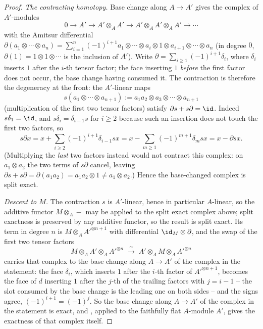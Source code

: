 \begin{proof}
\emph{The contracting homotopy.}  Base change along $A\to A'$ gives the
complex of $A'$-modules
\[
0\to A'\to A'\otimes_AA'\to A'\otimes_AA'\otimes_AA'\to\cdots
\]
with the Amitsur differential
$\partial(a_1\otimes\cdots\otimes a_n)=
\sum_{i=1}^n(-1)^{i+1}a_1\otimes\cdots\otimes a_i\otimes1\otimes
a_{i+1}\otimes\cdots\otimes a_n$ (in degree $0$,
$\partial(1)=1\otimes1\otimes\cdots$ is the inclusion of $A'$).
Write $\partial=\sum_{i\ge1}(-1)^{i+1}\delta_i$, where $\delta_i$ inserts
$1$ after the $i$-th tensor factor; the face inserting $1$ \emph{before}
the first factor does not occur, the base change having consumed it.
The contraction is therefore the degeneracy at the front: the
$A'$-linear maps
\[
s(a_1\otimes\cdots\otimes a_{n+1}):=a_1a_2\otimes a_3\otimes\cdots
\otimes a_{n+1}
\]
(multiplication of the first two tensor factors) satisfy
$\partial s+s\partial=\id$.  Indeed $s\delta_1=\id$, and
$s\delta_i=\delta_{i-1}s$ for $i\ge2$ because such an insertion does not
touch the first two factors, so
\[
s\partial x=x+\sum_{i\ge2}(-1)^{i+1}\delta_{i-1}sx
=x-\sum_{m\ge1}(-1)^{m+1}\delta_msx=x-\partial sx .
\]
(Multiplying the \emph{last} two factors instead would not contract this
complex: on $a_1\otimes a_2$ the two terms of $s\partial$ cancel, leaving
$\partial s+s\partial=\partial(a_1a_2)=a_1a_2\otimes1\ne a_1\otimes a_2$.)
Hence the base-changed complex is split exact.

\emph{Descent to $M$.}  The contraction $s$ is $A'$-linear, hence in
particular $A$-linear, so the additive functor $M\otimes_A-$ may be
applied to the split exact complex above; split exactness is preserved
by any additive functor, so the result is split exact.  Its term in
degree $n$ is $M\otimes_AA'^{\otimes n+1}$ with differential
$\id_M\otimes\partial$, and the swap of the first two tensor factors
\[
M\otimes_AA'\otimes_AA'^{\otimes n}\;\xrightarrow{\ \sim\ }\;
A'\otimes_AM\otimes_AA'^{\otimes n}
\]
carries that complex to the base change along $A\to A'$ of the complex
in the statement: the face $\delta_i$, which inserts $1$ after the
$i$-th factor of $A'^{\otimes n+1}$, becomes the face of $d$ inserting
$1$ after the $j$-th of the trailing factors with $j=i-1$ -- the slot
consumed by the base change is the leading one on both sides -- and the
signs agree, $(-1)^{i+1}=(-1)^{j}$.  So the base change along $A\to A'$
of the complex in the statement is exact, and
, applied to the faithfully flat
$A$-module $A'$, gives the exactness of that complex itself.
\end{proof}

